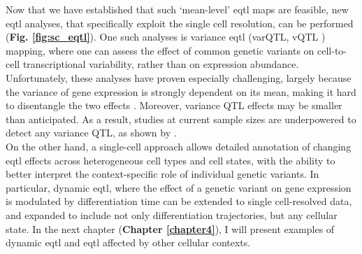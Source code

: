 Now that we have established that such `mean-level' \gls{eqtl} maps are feasible, new \gls{eqtl} analyses, that specifically exploit the single cell resolution, can be performed (\textbf{Fig. \ref{fig:sc_eqtl}}).
One such analyses is variance \gls{eqtl} (varQTL, vQTL \cite{ayroles2015behavioral}) mapping, where one can assess the effect of common genetic variants on cell-to-cell transcriptional variability, rather than on expression abundance.
Unfortunately, these analyses have proven especially challenging, largely because the variance of gene expression is strongly dependent on its mean, making it hard to disentangle the two effects \cite{vallejos2016beyond}.
Moreover, variance QTL effects may be smaller than anticipated.
As a result, studies at current sample sizes are underpowered to detect any variance QTL, as 
shown by \cite{sarkar2019discovery}. \\

On the other hand, a single-cell approach allows detailed annotation of changing \gls{eqtl} effects across heterogeneous cell types and cell states, with the ability to better interpret the context-specific role of individual genetic variants. 
In particular, dynamic \gls{eqtl}, where the effect of a genetic variant on gene expression is modulated by differentiation time \cite{francesconi2014effects, strober2019dynamic} can be extended to single cell-resolved data, and expanded to include not only differentiation trajectories, but any cellular state.
In the next chapter (\textbf{Chapter \ref{chapter4}}), I will present examples of dynamic \gls{eqtl} and \gls{eqtl} affected by other cellular contexts.